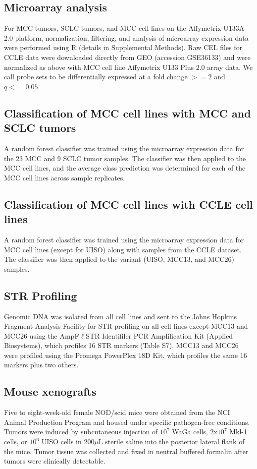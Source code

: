 \documentclass[10pt]{article}
\begin{document}
\subsection*{Microarray analysis}
For MCC tumors, SCLC tumors, and MCC cell lines on the Affymetrix U133A 2.0 platform, normalization, filtering, and analysis of microarray expression data were performed using R (details in Supplemental Methods).
Raw CEL files for CCLE data were downloaded directly from GEO (accession GSE36133) and were normalized as above with MCC cell line Affymetrix U133 Plus 2.0 array data.
We call probe sets to be differentially expressed at a fold change $>= 2$ and $q <= 0.05$.

\subsection*{Classification of MCC cell lines with MCC and SCLC tumors}
A random forest classifier was trained using the microarray expression data for the 23 MCC and 9 SCLC tumor samples.
The classifier was then applied to the MCC cell lines, and the average class prediction was determined for each of the MCC cell lines across sample replicates.

\subsection*{Classification of MCC cell lines with CCLE cell lines}
A random forest classifier was trained using the microarray expression data for MCC cell lines (except for UISO) along with samples from the CCLE dataset.
The classifier was then applied to the variant (UISO, MCC13, and MCC26) samples.

\subsection*{STR Profiling}
Genomic DNA was isolated from all cell lines and sent to the Johns Hopkins Fragment Analysis Facility for STR profiling on all cell lines except MCC13 and MCC26 using the AmpF$\ell$STR Identifiler PCR Amplification Kit (Applied Biosystems), which profiles 16 STR markers (Table S7). MCC13 and MCC26 were profiled using the Promega PowerPlex 18D Kit, which profiles the same 16 markers plus two others.

\subsection*{Mouse xenografts}
Five to eight-week-old female NOD/scid mice were obtained from the NCI Animal Production Program and housed under specific pathogen-free conditions.
Tumors were induced by subcutaneous injection of $10^7$ WaGa cells, $2\mathrm{x}10^7$ Mkl-1 cells, or $10^6$ UISO cells in $200\mu\mathrm{L}$ sterile saline into the posterior lateral flank of the mice.
Tumor tissue was collected and fixed in neutral buffered formalin after tumors were clinically detectable.
\end{document}
